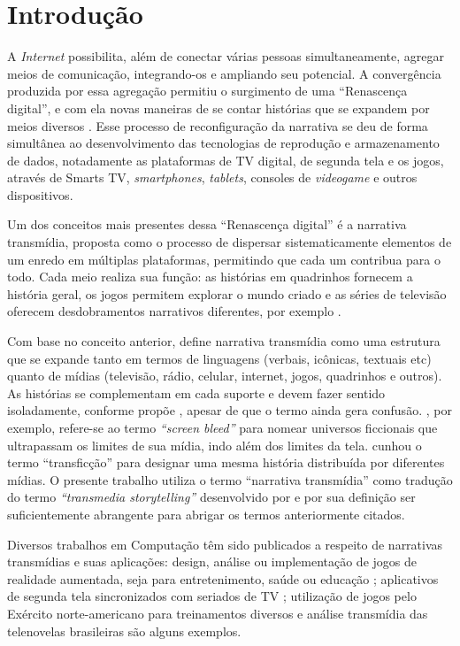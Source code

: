 \documentclass[
article,			%
11pt,				%
oneside,			%
a4paper,			%
english,			%
brazil,				%
sumario=tradicional
]{abntex2}
\begin{document}
  \section{Introdução}

  A \textit{Internet} possibilita, além de conectar várias pessoas simultaneamente, agregar meios de comunicação, integrando-os e ampliando seu potencial. A convergência produzida por essa agregação permitiu o surgimento de uma ``Renascença digital'', e com ela novas maneiras de se contar histórias que se expandem por meios diversos \cite{jenkins_2001}. Esse processo de reconfiguração da narrativa se deu de forma simultânea ao desenvolvimento das tecnologias de reprodução e armazenamento de dados, notadamente as plataformas de TV digital, de segunda tela e os jogos, através de Smarts TV, \textit{smartphones}, \textit{tablets}, consoles de \textit{videogame} e outros dispositivos.

  Um dos conceitos mais presentes dessa ``Renascença digital'' é a narrativa transmídia, proposta como o processo de dispersar sistematicamente elementos de um enredo em múltiplas plataformas, permitindo que cada um contribua para o todo. Cada meio realiza sua função: as histórias em quadrinhos fornecem a história geral, os jogos permitem explorar o mundo criado e as séries de televisão oferecem desdobramentos narrativos diferentes, por exemplo \cite{jenkins_fastcompany_2011}.

  Com base no conceito anterior,  define narrativa transmídia como uma estrutura que se expande tanto em termos de linguagens (verbais, icônicas, textuais etc) quanto de mídias (televisão, rádio, celular, internet, jogos, quadrinhos e outros). As histórias se complementam em cada suporte e devem fazer sentido isoladamente, conforme propõe , apesar de que o termo ainda gera confusão. , por exemplo, refere-se ao termo \textit{``screen bleed''} para nomear universos ficcionais que ultrapassam os limites de sua mídia, indo além dos limites da tela.  cunhou o termo ``transficção''  para  designar  uma  mesma  história  distribuída  por  diferentes  mídias. O presente trabalho utiliza o termo ``narrativa transmídia'' como tradução do termo \textit{``transmedia storytelling''} desenvolvido por  e por sua definição ser suficientemente abrangente para abrigar os termos anteriormente citados.

  Diversos trabalhos em Computação têm sido publicados a respeito de narrativas transmídias e suas aplicações: design, análise ou implementação de jogos de realidade aumentada, seja para entretenimento, saúde ou educação \cite{bonsignore_2012,evans_2014,johnston_2012,holler_2014}; aplicativos de segunda tela sincronizados com seriados de TV \cite{nandakumar_2014}; utilização de jogos pelo Exército norte-americano para treinamentos diversos \cite{raybourn_2014} e análise transmídia das telenovelas brasileiras \cite{murakami_2015} são alguns exemplos.
\end{document}
